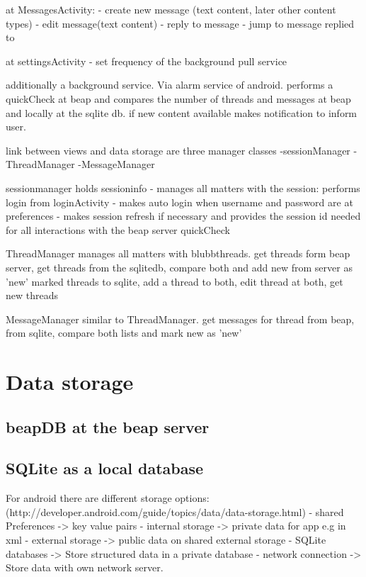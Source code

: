 \documentclass[12pt,a4paper,oneside]{report}
\begin{document}
at MessagesActivity:
- create new message (text content, later other content types)
- edit message(text content)
- reply to message
- jump to message replied to

at settingsActivity
- set frequency of the background pull service

additionally a background service. Via alarm service of android.
performs a quickCheck at beap and compares the number of threads and messages at beap and locally at the sqlite db. if new content available makes notification to inform user.

link between views and data storage are three manager classes
-sessionManager
-ThreadManager
-MessageManager


sessionmanager holds sessioninfo - manages all matters with the session: performs login from loginActivity - makes auto login when username and password are at preferences - makes session refresh if necessary and provides the session id needed for all interactions with the beap server quickCheck 

ThreadManager manages all matters with blubbthreads. get threads form beap server, get threads from the sqlitedb, compare both and add new from server as 'new' marked threads to sqlite, add a thread to both, edit thread at both, get new threads

MessageManager similar to ThreadManager. get messages for thread from beap, from sqlite, compare both lists and mark new as 'new' 



\section{Data storage}

\subsection{beapDB at the beap server}

\subsection{SQLite as a local database}

For android there are different storage options:
(http://developer.android.com/guide/topics/data/data-storage.html)
- shared Preferences -> key value pairs
- internal storage -> private data for app e.g in xml
- external storage -> public data on shared external storage
- SQLite databases -> Store structured data in a private database
- network connection -> Store data with own network server.
\end{document}
